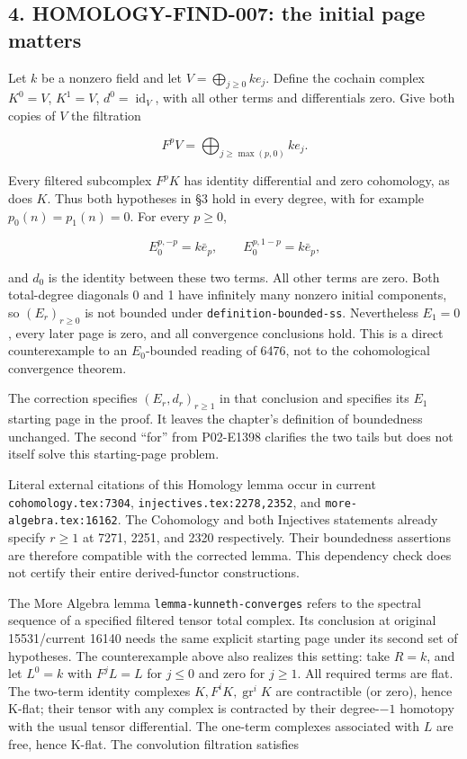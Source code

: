 \documentclass[11pt]{article}
\begin{document}
\subsection{4. HOMOLOGY-FIND-007: the initial page matters}\label{note-07-homology-find-007-the-initial-page-matters}

Let \(k\) be a nonzero field and let \(V=\bigoplus_{j\geq0}ke_j\). Define the cochain complex \(K^0=V\), \(K^1=V\), \(d^0=\operatorname{id}_V\), with all other terms and differentials zero. Give both copies of \(V\) the filtration

\[
F^pV=\bigoplus_{j\geq\max(p,0)}ke_j.
\]

Every filtered subcomplex \(F^pK\) has identity differential and zero cohomology, as does \(K\). Thus both hypotheses in §3 hold in every degree, with for example \(p_0(n)=p_1(n)=0\). For every \(p\geq0\),

\[
E_0^{p,-p}=k\bar e_p,\qquad
E_0^{p,1-p}=k\bar e_p,
\]

and \(d_0\) is the identity between these two terms. All other terms are zero. Both total-degree diagonals 0 and 1 have infinitely many nonzero initial components, so \((E_r)_{r\geq0}\) is not bounded under \texttt{definition-bounded-ss}. Nevertheless \(E_1=0\), every later page is zero, and all convergence conclusions hold. This is a direct counterexample to an \(E_0\)-bounded reading of 6476, not to the cohomological convergence theorem.

The correction specifies \((E_r,d_r)_{r\geq1}\) in that conclusion and specifies its \(E_1\) starting page in the proof. It leaves the chapter's definition of boundedness unchanged. The second ``for'' from P02-E1398 clarifies the two tails but does not itself solve this starting-page problem.

Literal external citations of this Homology lemma occur in current \texttt{cohomology.tex:7304}, \texttt{injectives.tex:2278,2352}, and \texttt{more-algebra.tex:16162}. The Cohomology and both Injectives statements already specify \(r\geq1\) at 7271, 2251, and 2320 respectively. Their boundedness assertions are therefore compatible with the corrected lemma. This dependency check does not certify their entire derived-functor constructions.

The More Algebra lemma \texttt{lemma-kunneth-converges} refers to the spectral sequence of a specified filtered tensor total complex. Its conclusion at original 15531/current 16140 needs the same explicit starting page under its second set of hypotheses. The counterexample above also realizes this setting: take \(R=k\), and let \(L^0=k\) with \(F^jL=L\) for \(j\leq0\) and zero for \(j\geq1\). All required terms are flat. The two-term identity complexes \(K,F^iK,\operatorname{gr}^iK\) are contractible (or zero), hence K-flat; their tensor with any complex is contracted by their degree-\(-1\) homotopy with the usual tensor differential. The one-term complexes associated with \(L\) are free, hence K-flat. The convolution filtration satisfies
\end{document}

